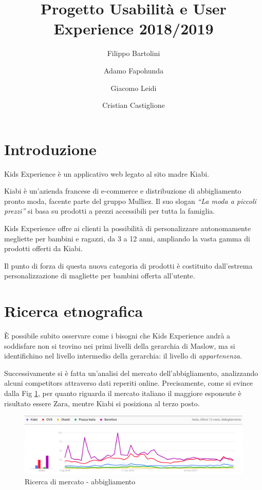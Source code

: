 \documentclass[12pt,italian,]{report}
\title{Progetto Usabilità e User Experience 2018/2019}
\author{Filippo Bartolini \and Adamo Fapohunda \and Giacomo Leidi \and Cristian Castiglione}
\date{}
\begin{document}
\maketitle

{
\setcounter{tocdepth}{2}
\tableofcontents
}
\newpage
\section{Introduzione}\label{introduzione}
Kids Experience è un applicativo web legato al sito madre Kiabi.

Kiabi è un'azienda francese di e-commerce e distribuzione di
abbigliamento pronto moda, facente parte del gruppo Mulliez. Il suo
slogan \emph{``La moda a piccoli prezzi''} si basa su prodotti a prezzi
accessibili per tutta la famiglia.

Kids Experience offre ai clienti la possibilità di personalizzare
autonomamente megliette per bambini e ragazzi, da 3 a 12 anni, ampliando la vasta gamma di prodotti offerti da Kiabi.

Il punto di forza di questa nuova categoria di prodotti è costituito dall'estrema personalizzazione di magliette per bambini offerta all'utente.

\section{Ricerca etnografica}\label{ricerca-etnografica}
È possibile subito osservare come i bisogni che Kids Experience andrà a soddisfare non si trovino nei primi livelli della gerarchia di Maslow, ma si identifichino nel livello intermedio della gerarchia: il livello
di \emph{appartenenza}.

Successivamente si è fatta un'analisi del mercato dell'abbigliamento, analizzando alcuni competitors attraverso dati reperiti online.
Precisamente, come si evince dalla Fig \ref{abbigliamo_generico}, per quanto riguarda il
mercato italiano il maggiore esponente è risultato essere Zara, mentre Kiabi si posiziona al terzo posto.

\begin{figure}[h]
\centering
\includegraphics{img/abbigliamento_generico.png}
\caption{Ricerca di mercato - abbigliamento}
\label{abbigliamo_generico}
\end{figure}
\end{document}
